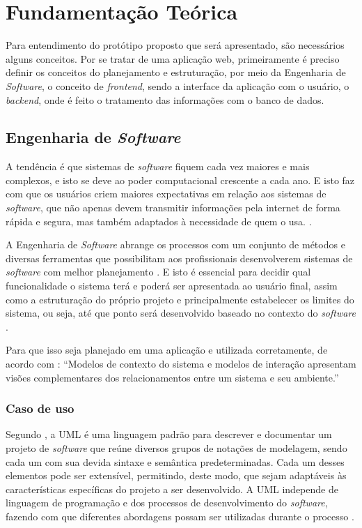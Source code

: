 \chapter{Fundamentação Teórica}\label{chp:LABEL_CHP_2}
Para entendimento do protótipo proposto que será apresentado, são necessários alguns conceitos. Por se tratar de uma aplicação web, primeiramente é preciso definir os conceitos do planejamento e estruturação, por meio da Engenharia de \textit{Software}, o conceito de \textit{frontend}, sendo a interface da aplicação com o usuário, o \textit{backend}, onde é feito o tratamento das informações com o banco de dados.

\section{Engenharia de \textit{Software}}\label{engsoft}
A tendência é que sistemas de \textit{software} fiquem cada vez maiores e mais complexos, e isto se deve ao poder computacional crescente a cada ano. E isto faz com que os usuários criem maiores expectativas em relação aos sistemas de \textit{software}, que não apenas devem transmitir informações pela internet de forma rápida e segura, mas também adaptados à necessidade de quem o usa. \cite{SOMMERVILE}.

A Engenharia de \textit{Software} abrange os processos com um conjunto de métodos e diversas ferramentas que possibilitam aos profissionais desenvolverem sistemas de \textit{software} com melhor planejamento \cite{PRESSMAN}. E isto é essencial para decidir qual funcionalidade o sistema terá e poderá ser apresentada ao usuário final, assim como a estruturação do próprio projeto e principalmente estabelecer os limites do sistema, ou seja, até que ponto será desenvolvido baseado no contexto do \textit{software} \cite{SOMMERVILE}.

Para que isso seja planejado em uma aplicação e utilizada corretamente, de acordo com : “Modelos de contexto do sistema e modelos de interação apresentam visões complementares dos relacionamentos entre um sistema e seu ambiente.”
\subsection{Caso de uso}
Segundo , a UML é uma linguagem padrão para descrever e documentar um projeto de \textit{software} que reúne diversos grupos de notações de modelagem, sendo cada um com sua devida sintaxe e semântica predeterminadas. Cada um desses elementos pode ser extensível, permitindo, deste modo, que sejam adaptáveis às características específicas do projeto a ser desenvolvido. A UML independe de linguagem de programação e dos processos de desenvolvimento do \textit{software}, fazendo com que diferentes abordagens possam ser utilizadas durante o processo \cite{BEZERRA}.

